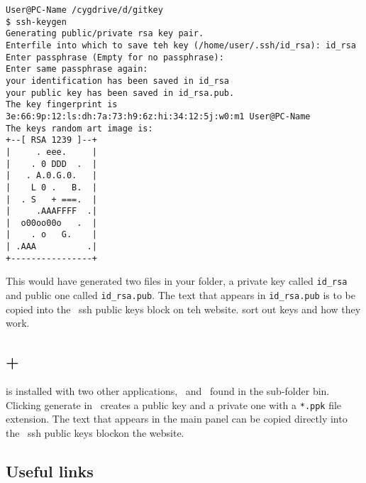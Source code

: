 \begin{verbatim}
User@PC-Name /cygdrive/d/gitkey
$ ssh-keygen
Generating public/private rsa key pair. 
Enterfile into which to save teh key (/home/user/.ssh/id_rsa): id_rsa
Enter passphrase (Empty for no passphrase):
Enter same passphrase again:
your identification has been saved in id_rsa
your public key has been saved in id_rsa.pub.
The key fingerprint is
3e:66:9p:12:ls:dh:7a:73:h9:6z:hi:34:12:5j:w0:m1 User@PC-Name
The keys random art image is:
+--[ RSA 1239 ]--+
|     . eee.     |
|    . 0 DDD  .  |
|   . A.0.G.0.   |
|    L 0 .   B.  |
|  . S   + ===.  |
|     .AAAFFFF  .|
|  o00oo00o   .  |
|    . o   G.    |
| .AAA          .|
+----------------+   
\end{verbatim}

This would have generated two files in your folder, a private key called \verb|id_rsa| and  public one called \verb|id_rsa.pub|. The text that appears in \verb|id_rsa.pub| is to be copied into the \gh\ ssh public keys block on teh website. \ed sort out keys and how they work. \ed

\subsection{\git + \msys}

\git is installed with two other applications, \putty\ and \page\ found in the sub-folder bin. Clicking generate in \putty\ creates a public key and a private one with a \verb|*.ppk| file extension. The text that appears in the main panel can be copied directly into the \gh\ ssh public keys blockon the website. 

\subsection{Useful links}

